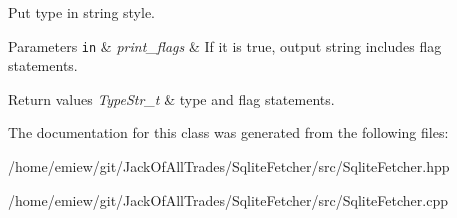 Put type in string style. 
\begin{DoxyParams}[1]{Parameters}
\mbox{\tt in}  & {\em print\+\_\+flags} & If it is true, output string includes flag statements. \\
\hline
\end{DoxyParams}

\begin{DoxyRetVals}{Return values}
{\em Type\+Str\+\_\+t} & type and flag statements. \\
\hline
\end{DoxyRetVals}


The documentation for this class was generated from the following files\+:\begin{DoxyCompactItemize}
\item 
/home/emiew/git/\+Jack\+Of\+All\+Trades/\+Sqlite\+Fetcher/src/Sqlite\+Fetcher.\+hpp\item 
/home/emiew/git/\+Jack\+Of\+All\+Trades/\+Sqlite\+Fetcher/src/Sqlite\+Fetcher.\+cpp\end{DoxyCompactItemize}
